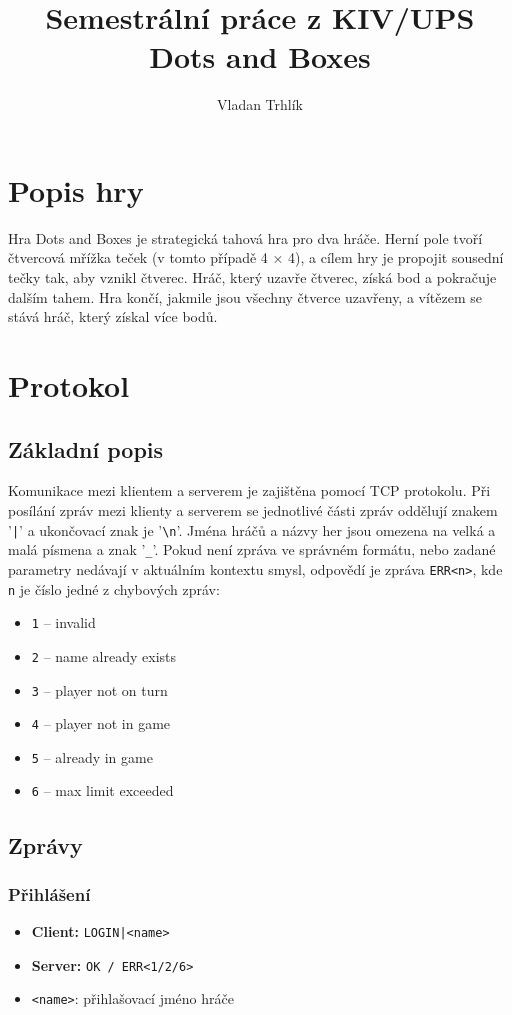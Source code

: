 \documentclass[11pt,a4paper]{article}
\author{Vladan Trhlík}
\title{%
	Semestrální práce z KIV/UPS \\
	\large Dots and Boxes  \\
}
\begin{document}
\maketitle

\section{Popis hry}
Hra Dots and Boxes je strategická tahová hra pro dva hráče. Herní pole tvoří čtvercová mřížka teček (v tomto případě 4 × 4), a cílem hry je propojit sousední tečky tak, aby vznikl čtverec. Hráč, který uzavře čtverec, získá bod a pokračuje dalším tahem. Hra končí, jakmile jsou všechny čtverce uzavřeny, a vítězem se stává hráč, který získal více bodů.
\section{Protokol}

\subsection{Základní popis}
Komunikace mezi klientem a serverem je zajištěna pomocí TCP protokolu. Při posílání zpráv mezi klienty a serverem se jednotlivé části zpráv oddělují znakem '\texttt{|}' a ukončovací znak je '\texttt{\textbackslash n}'. Jména hráčů a názvy her jsou omezena na velká a malá písmena a znak '\texttt{\_}'. Pokud není zpráva ve správném formátu, nebo zadané parametry nedávají v aktuálním kontextu smysl, odpovědí je zpráva \texttt{ERR<n>}, kde \texttt{n} je číslo jedné z chybových zpráv:
\begin{itemize}
	\item \texttt{1} -- invalid
	\item \texttt{2} -- name already exists
	\item \texttt{3} -- player not on turn
	\item \texttt{4} -- player not in game
	\item \texttt{5} -- already in game
	\item \texttt{6} -- max limit exceeded
\end{itemize}

\subsection{Zprávy}
\subsubsection*{Přihlášení}
\begin{itemize}
	\item \textbf{Client:} \texttt{LOGIN|<name>}
	\item \textbf{Server:} \texttt{OK / ERR<1/2/6>}
	\item \texttt{<name>}: přihlašovací jméno hráče
\end{itemize}
\end{document}
